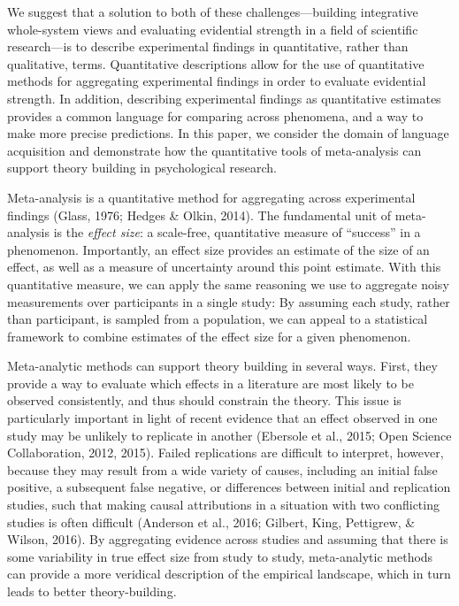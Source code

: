 \documentclass[9pt,twocolumn,twoside,lineno]{pnas-new}
\begin{document}
We suggest that a solution to both of these challenges---building
integrative whole-system views and evaluating evidential strength in a
field of scientific research---is to describe experimental findings in
quantitative, rather than qualitative, terms. Quantitative descriptions
allow for the use of quantitative methods for aggregating experimental
findings in order to evaluate evidential strength. In addition,
describing experimental findings as quantitative estimates provides a
common language for comparing across phenomena, and a way to make more
precise predictions. In this paper, we consider the domain of language
acquisition and demonstrate how the quantitative tools of meta-analysis
can support theory building in psychological research.


Meta-analysis is a quantitative method for aggregating across
experimental findings (Glass, 1976; Hedges \& Olkin, 2014). The
fundamental unit of meta-analysis is the \emph{effect size}: a
scale-free, quantitative measure of \enquote{success} in a phenomenon.
Importantly, an effect size provides an estimate of the size of an
effect, as well as a measure of uncertainty around this point estimate.
With this quantitative measure, we can apply the same reasoning we use
to aggregate noisy measurements over participants in a single study: By
assuming each study, rather than participant, is sampled from a
population, we can appeal to a statistical framework to combine
estimates of the effect size for a given phenomenon.

Meta-analytic methods can support theory building in several ways.
First, they provide a way to evaluate which effects in a literature are
most likely to be observed consistently, and thus should constrain the
theory. This issue is particularly important in light of recent evidence
that an effect observed in one study may be unlikely to replicate in
another (Ebersole et al., 2015; Open Science Collaboration, 2012, 2015).
Failed replications are difficult to interpret, however, because they
may result from a wide variety of causes, including an initial false
positive, a subsequent false negative, or differences between initial
and replication studies, such that making causal attributions in a
situation with two conflicting studies is often difficult (Anderson et
al., 2016; Gilbert, King, Pettigrew, \& Wilson, 2016). By aggregating
evidence across studies and assuming that there is some variability in
true effect size from study to study, meta-analytic methods can provide
a more veridical description of the empirical landscape, which in turn
leads to better theory-building.
\end{document}
